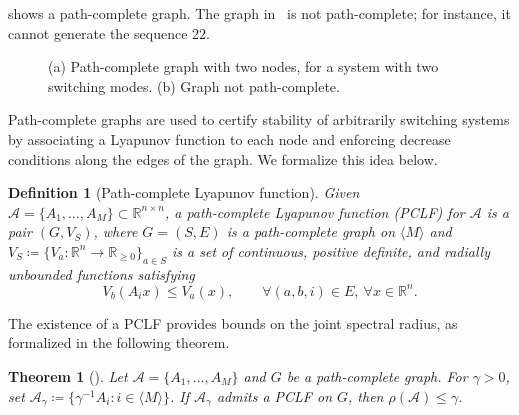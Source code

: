 \documentclass[letterpaper, 10 pt, conference]{ieeeconf}  %
\newcommand{\Mset}{\langle M\rangle}
\newtheorem{theorem}{Theorem}
\newtheorem{definition}{Definition}
\begin{document}
 shows a path-complete graph. The graph
in~ is not path-complete; for instance,
it cannot generate the sequence $22$.
\begin{figure}[ht] 
\centering 
{} \hspace{1.3cm}  \caption{(a) Path-complete graph with two nodes, for a system with two switching modes. (b) Graph not path-complete.} \label{fig:pc-vs-copc} \end{figure}

Path-complete graphs are used to certify stability of arbitrarily switching systems by associating a Lyapunov function to each node and enforcing decrease conditions along the edges of the graph. We formalize this
idea below.
\smallskip
\begin{definition}[Path-complete Lyapunov function]
Given $\mathcal A=\{A_1,\dots,A_M\}\subset\mathbb{R}^{n\times n}$, a
\emph{path-complete Lyapunov function} (PCLF) for $\mathcal A$ is a pair
$(G,V_S)$, where $G=(S,E)$ is a path-complete graph on $\Mset$ and
$V_S\coloneqq\{V_a:\mathbb{R}^n\to\mathbb{R}_{\ge0}\}_{a\in S}$ is a set of continuous, positive definite,
and radially unbounded functions satisfying
\[
V_b(A_i x) \le V_a(x),
\qquad \forall (a,b,i)\in E,\ \forall x\in\mathbb{R}^n.
\]
\end{definition}

\smallskip

The existence of a PCLF provides bounds on the joint spectral radius, as formalized in the following theorem.
\begin{theorem}[{\cite[Theorem~2.4]{ahmadi2014joint}}]
\label{thm:ub_jsr}
Let $\mathcal A=\{A_1,\dots,A_M\}$ and
$G$ be a path-complete graph. For $\gamma>0$, set
$\mathcal A_\gamma \coloneqq \{\gamma^{-1}A_i : i\in\Mset\}$.
If $\mathcal A_\gamma$ admits a PCLF on $G$, then
$\rho(\mathcal A)\le \gamma$.
\end{theorem}
\end{document}
